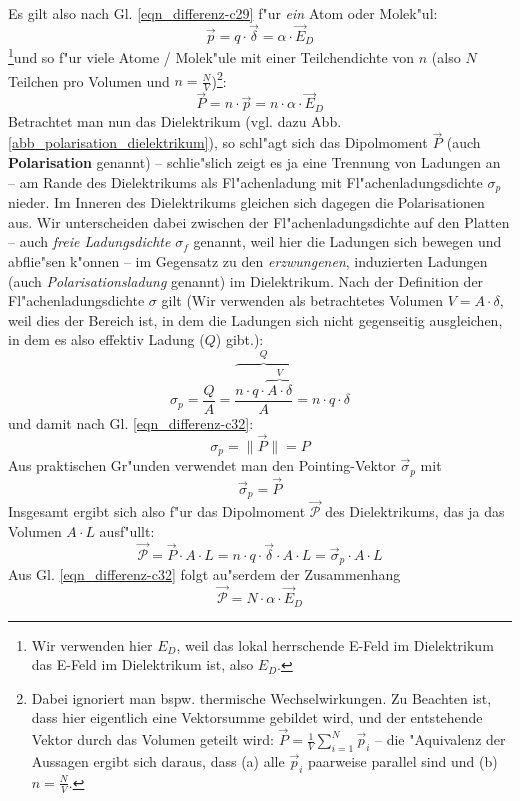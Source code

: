Es gilt also nach Gl. \eqref{eqn_differenz-c29} f"ur \emph{ein} Atom oder Molek"ul:
\begin{equation}
   \label{eqn_differenz-c31}
   \vec p = q \cdot \vec \delta = \alpha \cdot \vec E_D
\end{equation}
\footnote{Wir verwenden hier $E_D$, weil das lokal herrschende E-Feld
  im Dielektrikum das E-Feld im Dielektrikum ist, also $E_D$.}und so
f"ur viele Atome / Molek"ule mit einer Teilchendichte von $n$ (also
$N$ Teilchen pro
Volumen und $n = \frac{N}{V}$)\footnote{Dabei ignoriert man bspw. thermische
  Wechselwirkungen. Zu Beachten ist, dass hier eigentlich eine
  Vektorsumme gebildet wird, und der entstehende Vektor durch das
  Volumen geteilt wird: $\vec P = \frac{1}{V}\sum_{i = 1}^N \vec
  p_i$ -- die "Aquivalenz der Aussagen ergibt sich daraus, dass (a)
  alle $\vec p_i$ paarweise parallel sind und (b) $n = \frac{N}{V}$.}:
\begin{equation}
   \label{eqn_differenz-c32}
   \vec P = n \cdot \vec p = n \cdot \alpha \cdot \vec E_D
\end{equation}
Betrachtet man nun das Dielektrikum (vgl. dazu
Abb. \ref{abb_polarisation_dielektrikum}), so schl"agt sich das
Dipolmoment $\vec P$ (auch \textbf{Polarisation}
genannt) -- schlie"slich zeigt es ja eine Trennung von Ladungen an --
am Rande des Dielektrikums als Fl"achenladung mit Fl"achenladungsdichte
$\sigma_p$ nieder. Im Inneren des Dielektrikums gleichen sich dagegen
die Polarisationen aus. Wir unterscheiden dabei zwischen der
Fl"achenladungsdichte auf den Platten -- auch \emph{freie
  Ladungsdichte} $\sigma_f$ genannt, weil hier die Ladungen sich
bewegen und abflie"sen k"onnen -- im Gegensatz zu den
\emph{erzwungenen}, induzierten Ladungen (auch
\emph{Polarisationsladung} genannt) im Dielektrikum. Nach der
Definition der Fl"achenladungsdichte $\sigma$ gilt (Wir verwenden als
betrachtetes Volumen $V = A \cdot \delta$, weil dies der Bereich ist,
in dem die Ladungen sich nicht gegenseitig ausgleichen, in dem es also
effektiv Ladung ($Q$) gibt.):
\begin{equation}
   \label{eqn_differenz-c33}
   \sigma_p = \frac{Q}{A} = \frac{\overbrace{n
       \cdot q \cdot \overbrace{A \cdot \delta}^V}^{Q}}{A} =
n \cdot q \cdot \delta
\end{equation}
und damit nach Gl. \eqref{eqn_differenz-c32}:
\begin{equation}
   \label{eqn_differenz-c34}
   \sigma_p = \| \vec P \| = P
\end{equation}
Aus praktischen Gr"unden verwendet man den Pointing-Vektor $\vec
\sigma_p$ mit
\begin{equation}
\label{eqn_differenz-c38}
  \vec \sigma_p = \vec P
\end{equation}
Insgesamt ergibt sich also f"ur das Dipolmoment $\vec{\mathcal{P}}$ des
Dielektrikums, das ja das Volumen $A \cdot L$ ausf"ullt:
\begin{equation}
   \label{eqn_differenz-c35}
   \vec{\mathcal{P}} = \vec P \cdot A \cdot L = n \cdot q \cdot \vec \delta
   \cdot A \cdot L = \vec \sigma_p \cdot A \cdot L
\end{equation}
Aus Gl. \eqref{eqn_differenz-c32} folgt au"serdem der Zusammenhang
$$\vec{\mathcal{P}} = N \cdot \alpha \cdot \vec E_D$$

